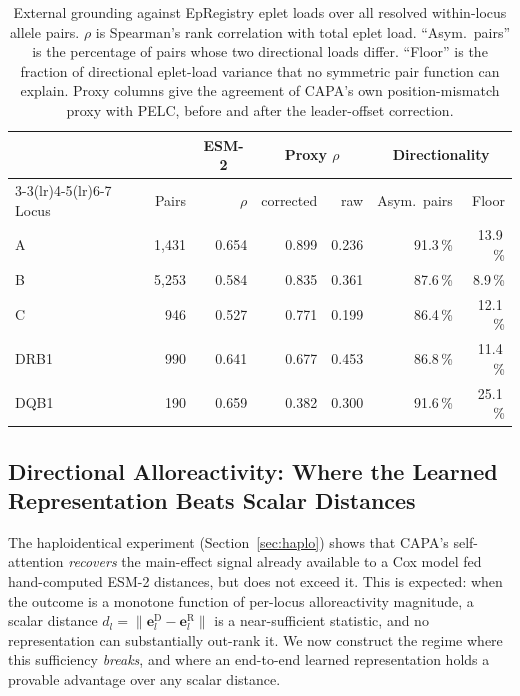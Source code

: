 \documentclass[11pt,a4paper]{article}
\begin{document}
\begin{table}[ht]
\centering
\caption{External grounding against EpRegistry eplet loads over all resolved
  within-locus allele pairs.  $\rho$ is Spearman's rank correlation with total
  eplet load.  ``Asym.\ pairs'' is the percentage of pairs whose two
  directional loads differ.  ``Floor'' is the fraction of directional
  eplet-load variance that no symmetric pair function can explain.  Proxy
  columns give the agreement of CAPA's own position-mismatch proxy with PELC,
  before and after the leader-offset correction.}
\label{tab:eplet}
\small
\begin{tabular}{lrrrrrr}
\toprule
 & & \multicolumn{1}{c}{ESM-2} & \multicolumn{2}{c}{Proxy $\rho$}
 & \multicolumn{2}{c}{Directionality} \\
\cmidrule(lr){3-3}\cmidrule(lr){4-5}\cmidrule(lr){6-7}
Locus & Pairs & $\rho$ & corrected & raw & Asym.\ pairs & Floor \\
\midrule
A    & 1{,}431 & 0.654 & 0.899 & 0.236 & 91.3\,\% & 13.9\,\% \\
B    & 5{,}253 & 0.584 & 0.835 & 0.361 & 87.6\,\% &  8.9\,\% \\
C    &     946 & 0.527 & 0.771 & 0.199 & 86.4\,\% & 12.1\,\% \\
DRB1 &     990 & 0.641 & 0.677 & 0.453 & 86.8\,\% & 11.4\,\% \\
DQB1 &     190 & 0.659 & 0.382 & 0.300 & 91.6\,\% & 25.1\,\% \\
\bottomrule
\end{tabular}
\end{table}

\subsection{Directional Alloreactivity: Where the Learned Representation Beats Scalar Distances}
\label{sec:directional}

The haploidentical experiment (Section~\ref{sec:haplo}) shows that CAPA's
self-attention \emph{recovers} the main-effect signal already available to a
Cox model fed hand-computed ESM-2 distances, but does not exceed it.  This is
expected: when the outcome is a monotone function of per-locus alloreactivity
magnitude, a scalar distance $d_l = \lVert \mathbf{e}^{\mathrm{D}}_l -
\mathbf{e}^{\mathrm{R}}_l \rVert$ is a near-sufficient statistic, and no
representation can substantially out-rank it.  We now construct the regime where
this sufficiency \emph{breaks}, and where an end-to-end learned representation
holds a provable advantage over any scalar distance.
\end{document}
